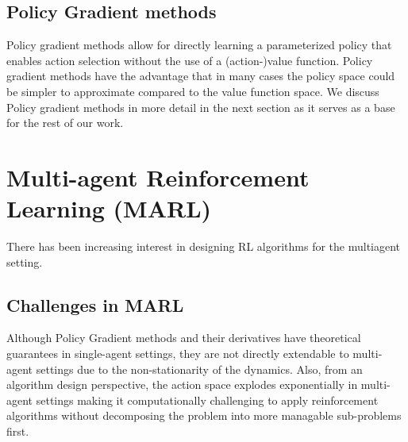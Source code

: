 \subsection{Policy Gradient methods}
\label{sec:spg}
Policy gradient methods allow for directly learning a parameterized policy that enables action
selection without the use of a (action-)value function.
Policy gradient methods have the advantage that in many cases the policy space could be simpler to
approximate compared to the value function space.
We discuss Policy gradient methods in more detail in the next section as it serves as a base for
the rest of our work.

\section{Multi-agent Reinforcement Learning (MARL)}\label{sec:marl}
There has been increasing interest in designing RL algorithms for the multiagent setting.

\subsection{Challenges in MARL}
Although Policy Gradient methods and their derivatives have theoretical guarantees in single-agent
settings, they are not directly extendable to multi-agent settings due to the non-stationarity of
the dynamics.
Also, from an algorithm design perspective, the action space explodes exponentially in multi-agent
settings making it computationally challenging to apply reinforcement algorithms without
decomposing the problem into more managable sub-problems first.

